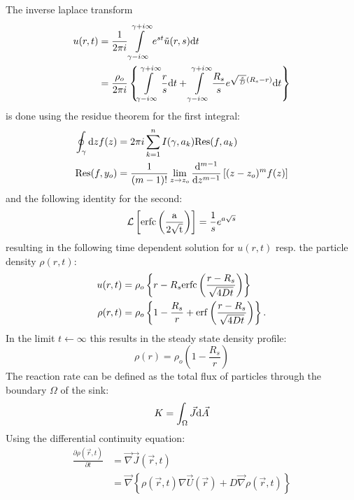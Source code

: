 The inverse laplace transform
\begin{align}
    u(r,t)  &= \frac{1}{2 \pi i} \int\limits_{\gamma - i \infty}^{\gamma + i \infty}  e^{st} \tilde{u}(r,s){\rm d}t \\
    &= \frac{\rho_o}{ 2 \pi i} \left\{  \int\limits_{\gamma - i \infty}^{\gamma + i \infty} \frac{r}{s}  {\rm d}t +  \int\limits_{\gamma - i \infty}^{\gamma + i \infty}\frac{R_s}{s} e^{ \sqrt{\frac{s}{D}}(R_s - r) }  {\rm d}t \right\}
    \label{inverse laplace}
\end{align}
is done using the residue theorem for the first integral:
\begin{align}
    \oint_{ \gamma } {\rm d}z f(z) &= 2 \pi i \sum_{k = 1}^{n}I(\gamma, a_k) {\rm Res}(f,a_k) \\
    { \rm Res}(f,y_o) &= \frac{1}{(m-1)!} \lim_{z\rightarrow z_o} \frac{{ \rm d} ^{m-1}}{{\rm d} z^{m-1}} \left[ (z - z_o)^{m}f(z) \right]
    \label{residue theorem}
\end{align}
and the following identity for the second:
\begin{equation}
    \mathcal{L}\left[ {\rm erfc\left( \frac{a}{2\sqrt{t}} \right)} \right] = \frac{1}{s}e^{a\sqrt{s}}
    \label{L(erfc)}
\end{equation}
resulting in the following time dependent solution for $u(r,t)$ resp. the particle density $\rho(r,t)$:
\begin{align}
    u(r,t) &= \rho_o \left\{ r - R_s {\rm erfc} \left( \frac{r - R_s}{\sqrt{4 D t}} \right) \right\} \\
    \rho(r,t) &= \rho_o \left\{ 1 - \frac{R_s}{r} + {\rm erf} \left( \frac{r - R_s}{\sqrt{4Dt}} \right) \right\}.
    \label{u(r,t)}
\end{align}
In the limit $t \leftarrow \infty$ this results in the steady state density profile:
\begin{equation}
    \rho(r) =  \rho_o \left( 1 - \frac{R_s}{r} \right)
    \label{steady state density}
\end{equation}
The reaction rate can be defined as the total flux of particles through the boundary $\Omega$ of the sink:
\begin{equation}
    K = \int_\Omega \vec{J} {\rm d}\vec{A} 
    \label{reaction rate}
\end{equation}
Using the differential continuity equation:
\begin{align}
    \frac{\partial \rho(\vec{r},t)}{\partial t}&= \vec{\nabla} \vec{J}(\vec{r},t) \\
    &= \vec{\nabla} \left\{ \rho(\vec{r},t) \nabla \vec{U}(\vec{r}) + D \vec{\nabla} \rho(\vec{r},t) \right\}
    \label{contiuity equation}
\end{align}
